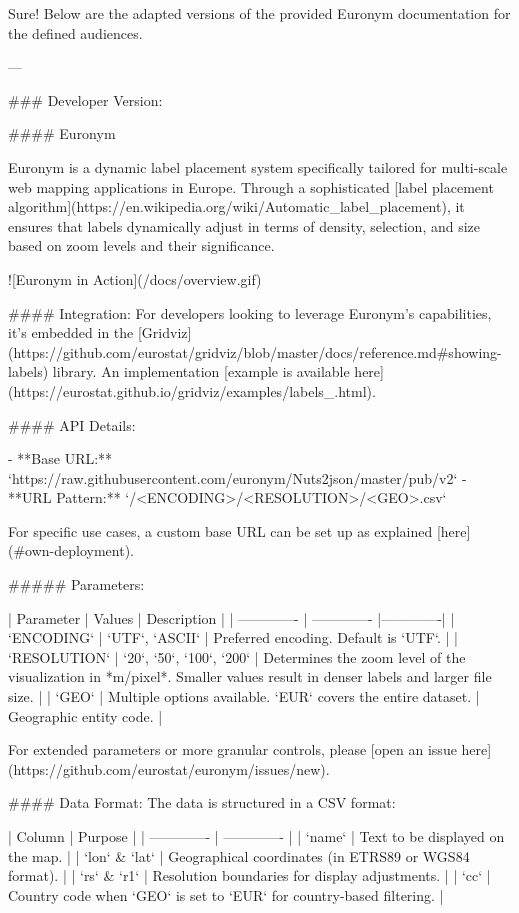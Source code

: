 Sure! Below are the adapted versions of the provided Euronym documentation for the defined audiences.

---

### Developer Version:

#### Euronym

Euronym is a dynamic label placement system specifically tailored for multi-scale web mapping applications in Europe. Through a sophisticated [label placement algorithm](https://en.wikipedia.org/wiki/Automatic_label_placement), it ensures that labels dynamically adjust in terms of density, selection, and size based on zoom levels and their significance.

![Euronym in Action](/docs/overview.gif)

#### Integration:
For developers looking to leverage Euronym's capabilities, it's embedded in the [Gridviz](https://github.com/eurostat/gridviz/blob/master/docs/reference.md#showing-labels) library. An implementation [example is available here](https://eurostat.github.io/gridviz/examples/labels_.html).

#### API Details:

- **Base URL:** `https://raw.githubusercontent.com/euronym/Nuts2json/master/pub/v2`
- **URL Pattern:** `/<ENCODING>/<RESOLUTION>/<GEO>.csv`
  
For specific use cases, a custom base URL can be set up as explained [here](#own-deployment).

##### Parameters:

| Parameter | Values | Description |
| ------------- | ------------- |-------------|
| `ENCODING` | `UTF`, `ASCII` | Preferred encoding. Default is `UTF`. |
| `RESOLUTION` | `20`, `50`, `100`, `200` | Determines the zoom level of the visualization in *m/pixel*. Smaller values result in denser labels and larger file size. |
| `GEO` | Multiple options available. `EUR` covers the entire dataset. | Geographic entity code. |

For extended parameters or more granular controls, please [open an issue here](https://github.com/eurostat/euronym/issues/new).

#### Data Format:
The data is structured in a CSV format:

| Column | Purpose |
| ------------- | ------------- |
| `name` | Text to be displayed on the map. |
| `lon` & `lat` | Geographical coordinates (in ETRS89 or WGS84 format). |
| `rs` & `r1` | Resolution boundaries for display adjustments. |
| `cc` | Country code when `GEO` is set to `EUR` for country-based filtering. |

